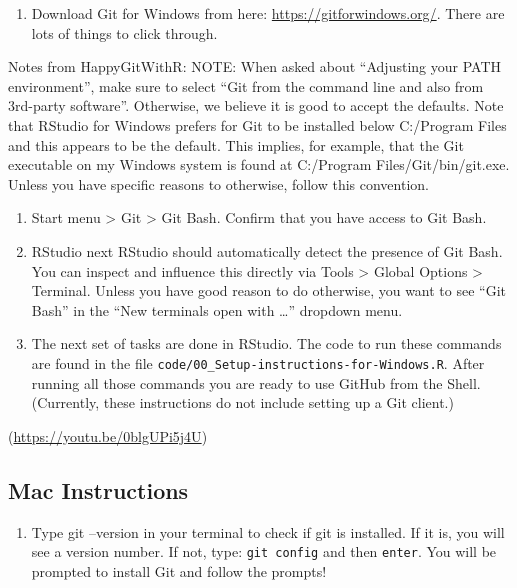 \documentclass[
]{book}
\providecommand{\tightlist}{%
  \setlength{\itemsep}{0pt}\setlength{\parskip}{0pt}}
\begin{document}
\begin{enumerate}
\def\labelenumi{\arabic{enumi})}
\tightlist
\item
  Download Git for Windows from here: \url{https://gitforwindows.org/}. There are lots of things to click through.
\end{enumerate}

Notes from HappyGitWithR:
NOTE: When asked about ``Adjusting your PATH environment'', make sure to select ``Git from the command line and also from 3rd-party software''. Otherwise, we believe it is good to accept the defaults.
Note that RStudio for Windows prefers for Git to be installed below C:/Program Files and this appears to be the default. This implies, for example, that the Git executable on my Windows system is found at C:/Program Files/Git/bin/git.exe. Unless you have specific reasons to otherwise, follow this convention.

\begin{enumerate}
\def\labelenumi{\arabic{enumi})}
\setcounter{enumi}{1}
\item
  Start menu \textgreater{} Git \textgreater{} Git Bash. Confirm that you have access to Git Bash.
\item
  RStudio next
  RStudio should automatically detect the presence of Git Bash. You can inspect and influence this directly via Tools \textgreater{} Global Options \textgreater{} Terminal. Unless you have good reason to do otherwise, you want to see ``Git Bash'' in the ``New terminals open with \ldots{}'' dropdown menu.
\item
  The next set of tasks are done in RStudio. The code to run these commands are found in the file \texttt{code/00\_Setup-instructions-for-Windows.R}. After running all those commands you are ready to use GitHub from the Shell. (Currently, these instructions do not include setting up a Git client.)
\end{enumerate}

(\url{https://youtu.be/0blgUPi5j4U})

\hypertarget{mac-instructions}{%
\subsection{Mac Instructions}\label{mac-instructions}}

\begin{enumerate}
\def\labelenumi{\arabic{enumi})}
\tightlist
\item
  Type git --version in your terminal to check if git is installed. If it is, you will see a version number. If not, type:
  \texttt{git\ config} and then \texttt{enter}. You will be prompted to install Git and follow the prompts!
\end{enumerate}
\end{document}
